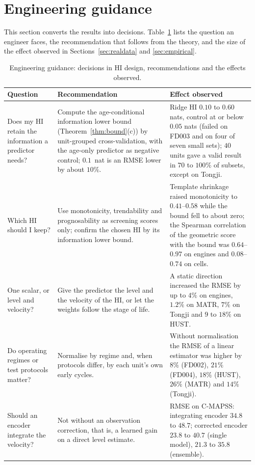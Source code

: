 \documentclass[preprint,12pt]{elsarticle}
\theoremstyle{definition}
\begin{document}
\section{Engineering guidance}
\label{sec:guidance}
This section converts the results into decisions. Table~\ref{tab:guidance} lists the question an engineer faces, the recommendation that follows from the theory, and the size of the effect observed in Sections~\ref{sec:realdata} and \ref{sec:empirical}.

\begin{table}[!t]
\caption{Engineering guidance: decisions in HI design, recommendations and the effects observed.}
\label{tab:guidance}
\footnotesize
\begin{tabular}{>{\raggedright\arraybackslash}p{2.9cm}p{5.6cm}p{6.5cm}}
\hline
Question & Recommendation & Effect observed \\
\hline
Does my HI retain the information a predictor needs? & Compute the age-conditional information lower bound (Theorem~\ref{thm:bound}(c)) by unit-grouped cross-validation, with the age-only predictor as negative control; $0.1$~nat is an RMSE lower by about $10\%$. & Ridge HI $0.10$ to $0.60$ nats, control at or below $0.05$ nats (failed on FD003 and on four of seven small sets); $40$ units gave a valid result in $70$ to $100\%$ of subsets, except on Tongji. \\
Which HI should I keep? & Use monotonicity, trendability and prognosability as screening scores only; confirm the chosen HI by its information lower bound. & Template shrinkage raised monotonicity to $0.41$--$0.58$ while the bound fell to about zero; the Spearman correlation of the geometric score with the bound was $0.64$--$0.97$ on engines and $0.08$--$0.74$ on cells. \\
One scalar, or level and velocity? & Give the predictor the level and the velocity of the HI, or let the weights follow the stage of life. & A static direction increased the RMSE by up to $4\%$ on engines, $1.2\%$ on MATR, $7\%$ on Tongji and $9$ to $18\%$ on HUST. \\
Do operating regimes or test protocols matter? & Normalise by regime and, when protocols differ, by each unit's own early cycles. & Without normalisation the RMSE of a linear estimator was higher by $8\%$ (FD002), $21\%$ (FD004), $18\%$ (HUST), $26\%$ (MATR) and $14\%$ (Tongji). \\
Should an encoder integrate the velocity? & Not without an observation correction, that is, a learned gain on a direct level estimate. & RMSE on C-MAPSS: integrating encoder $34.8$ to $48.7$; corrected encoder $23.8$ to $40.7$ (single model), $21.3$ to $35.8$ (ensemble). \\

\end{tabular}
\end{table}
\end{document}
